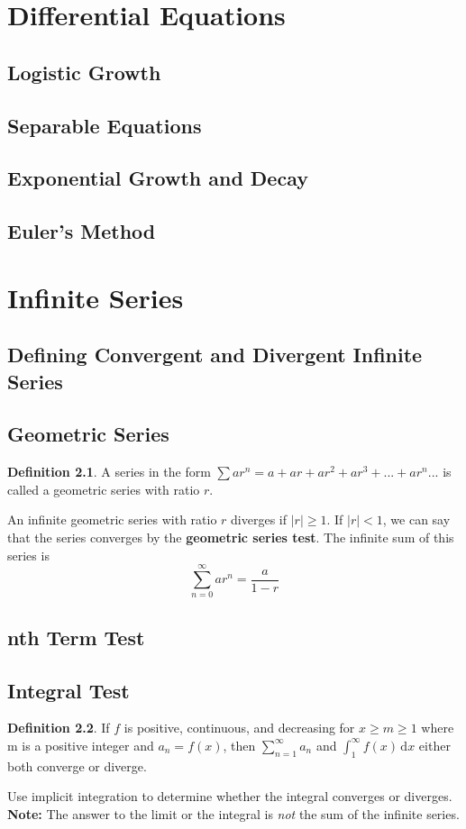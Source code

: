 \documentclass[letterpaper]{report}
\theoremstyle{definition}
\newtheorem{definition}{Definition}
\begin{document}
\chapter{Differential Equations}
\section{Logistic Growth}
\section{Separable Equations}
\section{Exponential Growth and Decay}
\section{Euler's Method}

\chapter{Infinite Series}
\section{Defining Convergent and Divergent Infinite Series}
\section{Geometric Series}
\begin{definition}
A series in the form $\sum{ar^n} = a + ar + ar^2 + ar^3 + ... + ar^n ...$
is called a geometric series with ratio $r$.
\end{definition}
An infinite geometric series with ratio $r$ diverges if $|r|\geq1$.
If $|r|<1$, we can say that the series converges by the 
\textbf{geometric series test}. The infinite sum of this series is
\[ \sum_{n=0}^\infty ar^n = \frac{a}{1-r} \]
\section{nth Term Test}
\section{Integral Test}
\begin{definition}
If $f$ is positive, continuous, and decreasing for $x\geq{}m\geq{}1$ where
m is a positive integer and $a_n=f(x)$, then $\sum_{n=1}^\infty a_n$ and
$\int_1^\infty f(x) \, \mathrm{d}x$ either both converge or diverge.
\end{definition}
Use implicit integration to determine whether the integral converges or diverges.
\textbf{Note:} The answer to the limit or the integral is \textit{not} the 
sum of the infinite series.
\end{document}

